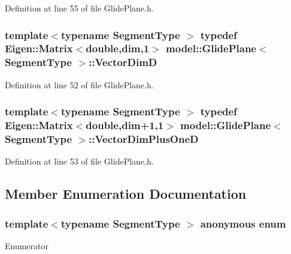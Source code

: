 Definition at line 55 of file Glide\+Plane.\+h.

\hypertarget{classmodel_1_1_glide_plane_a2bb10efbec7067be952e933cdeb21ce7}{}
\subsubsection[{Vector\+Dim\+D}]{\setlength{\rightskip}{0pt plus 5cm}template$<$typename Segment\+Type $>$ typedef Eigen\+::\+Matrix$<$double,{\bf dim},1$>$ {\bf model\+::\+Glide\+Plane}$<$ Segment\+Type $>$\+::{\bf Vector\+Dim\+D}}\label{classmodel_1_1_glide_plane_a2bb10efbec7067be952e933cdeb21ce7}


Definition at line 52 of file Glide\+Plane.\+h.

\hypertarget{classmodel_1_1_glide_plane_a8516128be029a332197dedbd1abb3a7c}{}
\subsubsection[{Vector\+Dim\+Plus\+One\+D}]{\setlength{\rightskip}{0pt plus 5cm}template$<$typename Segment\+Type $>$ typedef Eigen\+::\+Matrix$<$double,{\bf dim}+1,1$>$ {\bf model\+::\+Glide\+Plane}$<$ Segment\+Type $>$\+::{\bf Vector\+Dim\+Plus\+One\+D}}\label{classmodel_1_1_glide_plane_a8516128be029a332197dedbd1abb3a7c}


Definition at line 53 of file Glide\+Plane.\+h.



\subsection{Member Enumeration Documentation}
\hypertarget{classmodel_1_1_glide_plane_a04b3bf7d148a6d0624ab6fb63d6cf657}{}\subsubsection[{anonymous enum}]{\setlength{\rightskip}{0pt plus 5cm}template$<$typename Segment\+Type $>$ anonymous enum}\label{classmodel_1_1_glide_plane_a04b3bf7d148a6d0624ab6fb63d6cf657}
\begin{Desc}
\item[Enumerator]\par
\begin{description}
\item[{\em 
\hypertarget{classmodel_1_1_glide_plane_a04b3bf7d148a6d0624ab6fb63d6cf657a49f9a500624007dd90e2a82c8a2b699d}{}dim\label{classmodel_1_1_glide_plane_a04b3bf7d148a6d0624ab6fb63d6cf657a49f9a500624007dd90e2a82c8a2b699d}
}]\end{description}
\end{Desc}


